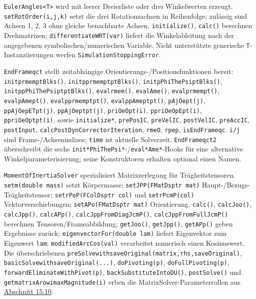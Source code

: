 \documentclass[
  12pt
]{book}
\begin{document}
\texttt{EulerAngles\textless{}T\textgreater{}} wird mit leerer
Dreierliste oder drei Winkelwerten erzeugt. \texttt{setRotOrder(i,j,k)}
setzt die drei Rotationsachsen in Reihenfolge; zulässig sind Achsen 1,
2, 3 ohne gleiche benachbarte Achsen. \texttt{initialize()},
\texttt{calc()} berechnen Drehmatrizen; \texttt{differentiateWRT(var)}
liefert die Winkelableitung nach der angegebenen
symbolischen/numerischen Variable. Nicht unterstützte generische
\texttt{T}-Instanziierungen werfen \texttt{SimulationStoppingError}.

\texttt{EndFrameqct} stellt zeitabhängige
Orientierungs-/Positionsfunktionen bereit: \texttt{initprmemptBlks()},
\texttt{initpprmemptptBlks()}, \texttt{initpPhiThePsiptBlks()},
\texttt{initppPhiThePsiptptBlks()}, \texttt{evalrmem()},
\texttt{evalAme()}, \texttt{evalprmempt()}, \texttt{evalpAmept()},
\texttt{evalpprmemptpt()}, \texttt{evalppAmeptpt()},
\texttt{pAjOept(j)}, \texttt{ppAjOepETpt(j)}, \texttt{ppAjOeptpt(j)},
\texttt{priOeOpt(i)}, \texttt{ppriOeOpEpt(i)}, \texttt{ppriOeOptpt(i)},
sowie \texttt{initialize*}, \texttt{prePosIC}, \texttt{preVelIC},
\texttt{postVelIC}, \texttt{preAccIC}, \texttt{postInput},
\texttt{calcPostDynCorrectorIteration}, \texttt{rmeO}, \texttt{rpep},
\texttt{isEndFrameqc}. \texttt{i/j} sind Frame-/Achsenindizes;
\texttt{time} ist aktuelle Solverzeit. \texttt{EndFrameqct2}
überschreibt die sechs
\texttt{init*PhiThePsi*}-/\texttt{eval*Ame*}-Hooks für eine alternative
Winkelparameterisierung; seine Konstruktoren erhalten optional einen
Namen.

\texttt{MomentOfInertiaSolver} spezialisiert Matrixzerlegung für
Trägheitstensoren. \texttt{setm(double\ mass)} setzt Körpermasse;
\texttt{setJPP(FMatDsptr\ mat)} Haupt-/Bezugs-Trägheitstensor;
\texttt{setrPoP(FColDsptr\ col)} und \texttt{setrPcmP(col)}
Vektorverschiebungen; \texttt{setAPo(FMatDsptr\ mat)} Orientierung.
\texttt{calc()}, \texttt{calcJoo()}, \texttt{calcJpp()},
\texttt{calcAPp()}, \texttt{calcJppFromDiagJcmP()},
\texttt{calcJppFromFullJcmP()} berechnen Tensoren/Frameabbildung;
\texttt{getJoo()}, \texttt{getJpp()}, \texttt{getAPp()} geben Ergebnisse
zurück; \texttt{eigenvectorFor(double\ lam)} liefert Eigenvektor zum
Eigenwert \texttt{lam}; \texttt{modifiedArcCos(val)} verarbeitet
numerisch einen Kosinuswert. Die überschriebenen
\texttt{preSolvewithsaveOriginal(matrix,rhs,saveOriginal)},
\texttt{basicSolvewithsaveOriginal(...)}, \texttt{doPivoting(p)},
\texttt{doFullPivoting(p)}, \texttt{forwardEliminateWithPivot(p)},
\texttt{backSubstituteIntoDU()}, \texttt{postSolve()} und
\texttt{getmatrixArowimaxMagnitude(i)} erben die
MatrixSolver-Parameterrollen aus
\protect\hyperlink{abs-api-matrizen}{Abschnitt 15.10}.
\end{document}
